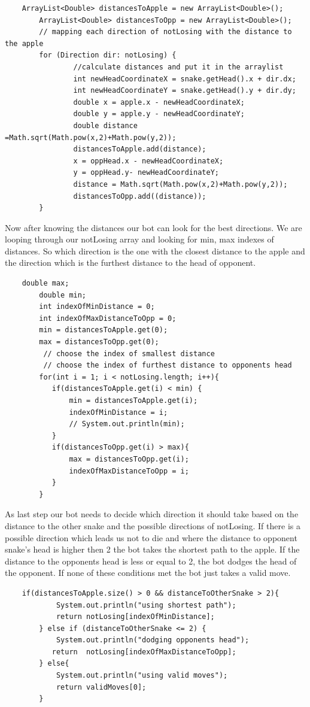 \documentclass[a4paper,12pt]{article}
\begin{document}
\begin{verbatim}
	ArrayList<Double> distancesToApple = new ArrayList<Double>();
        ArrayList<Double> distancesToOpp = new ArrayList<Double>();
        // mapping each direction of notLosing with the distance to the apple
        for (Direction dir: notLosing) {
                //calculate distances and put it in the arraylist
                int newHeadCoordinateX = snake.getHead().x + dir.dx;
                int newHeadCoordinateY = snake.getHead().y + dir.dy;
                double x = apple.x - newHeadCoordinateX;
                double y = apple.y - newHeadCoordinateY;
                double distance =Math.sqrt(Math.pow(x,2)+Math.pow(y,2));
                distancesToApple.add(distance);
                x = oppHead.x - newHeadCoordinateX;
                y = oppHead.y- newHeadCoordinateY;
                distance = Math.sqrt(Math.pow(x,2)+Math.pow(y,2));
                distancesToOpp.add((distance));
        }
\end{verbatim}
Now after knowing the distances our bot can look for the best directions. We are looping through our notLosing array and looking for min, max indexes of distances. So which direction is the one with the closest distance to the apple and the direction which is the furthest distance to the head of opponent.
\newpage
\begin{verbatim}
	double max;
        double min;
        int indexOfMinDistance = 0;
        int indexOfMaxDistanceToOpp = 0;
        min = distancesToApple.get(0);
        max = distancesToOpp.get(0);
         // choose the index of smallest distance
         // choose the index of furthest distance to opponents head
        for(int i = 1; i < notLosing.length; i++){
           if(distancesToApple.get(i) < min) {
               min = distancesToApple.get(i);
               indexOfMinDistance = i;
               // System.out.println(min);
           }
           if(distancesToOpp.get(i) > max){
               max = distancesToOpp.get(i);
               indexOfMaxDistanceToOpp = i;
           }
        }
\end{verbatim}
As last step our bot needs to decide which direction it should take based on the distance to the other snake and the possible directions of notLosing. If there is a possible direction which leads us not to die and where the distance to opponent snake's head is higher then 2 the bot takes the shortest path to the apple. If the distance to the opponents head is less or equal to 2, the bot dodges the head of the opponent. If none of these conditions met the bot just takes a valid move.
\begin{verbatim}
	if(distancesToApple.size() > 0 && distanceToOtherSnake > 2){
            System.out.println("using shortest path");
            return notLosing[indexOfMinDistance];
        } else if (distanceToOtherSnake <= 2) {
            System.out.println("dodging opponents head");
           return  notLosing[indexOfMaxDistanceToOpp];
        } else{
            System.out.println("using valid moves");
            return validMoves[0];
        }
\end{verbatim}
\end{document}
